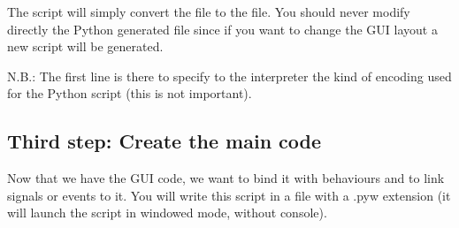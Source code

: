 \documentclass[english, 12 pt, openany, oneside]{book}
\begin{document}
The script will simply convert the  file to the  file. You should never modify directly the Python generated file since if you want to change the GUI layout a new script will be generated.

N.B.: The first line is there to specify to the interpreter the kind of encoding used for the Python script (this is not important).

\subsection{Third step: Create the main code}
Now that we have the GUI code, we want to bind it with behaviours and to link signals or events to it. You will write this script in a file with a .pyw extension (it will launch the script in windowed mode, without console).
\end{document}
